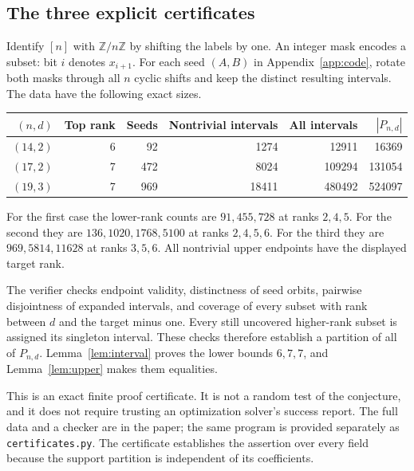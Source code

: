 \documentclass[11pt,a4paper]{article}
\begin{document}
\subsection{The three explicit certificates}
Identify $[n]$ with $\mathbb Z/n\mathbb Z$ by shifting the labels by one.
An integer mask encodes a subset: bit $i$ denotes $x_{i+1}$.
For each seed $(A,B)$ in Appendix~\ref{app:code}, rotate both masks
through all $n$ cyclic shifts and keep the distinct resulting intervals.
The data have the following exact sizes.
\begin{center}
\begin{tabular}{@{}rrrrrr@{}}
\toprule
$(n,d)$ & Top rank & Seeds & Nontrivial intervals & All intervals & $|P_{n,d}|$\\
\midrule
$(14,2)$&6&92&1274&12911&16369\\
$(17,2)$&7&472&8024&109294&131054\\
$(19,3)$&7&969&18411&480492&524097\\
\bottomrule
\end{tabular}
\end{center}
For the first case the lower-rank counts are $91,455,728$ at ranks
$2,4,5$. For the second they are $136,1020,1768,5100$ at ranks
$2,4,5,6$. For the third they are $969,5814,11628$ at ranks $3,5,6$.
All nontrivial upper endpoints have the displayed target rank.

The verifier checks endpoint validity, distinctness of seed orbits,
pairwise disjointness of expanded intervals, and coverage of every
subset with rank between $d$ and the target minus one. Every still
uncovered higher-rank subset is assigned its singleton interval.
These checks therefore establish a partition of all of $P_{n,d}$.
Lemma~\ref{lem:interval} proves the lower bounds $6,7,7$, and
Lemma~\ref{lem:upper} makes them equalities.

This is an exact finite proof certificate. It is not a random test of
the conjecture, and it does not require trusting an optimization
solver's success report. The full data and a checker are in the paper;
the same program is provided separately as \texttt{certificates.py}.
The certificate establishes the assertion over every field because
the support partition is independent of its coefficients.
\end{document}
